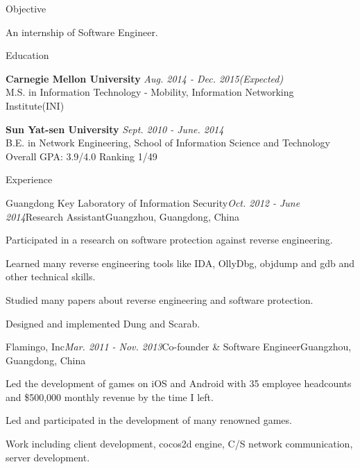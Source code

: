 \documentclass{resume} %
\begin{document}
\begin{rSection}{Objective}

An internship of Software Engineer.

\end{rSection}


\begin{rSection}{Education}

{\bf Carnegie Mellon University} \hfill {\em Aug. 2014 - Dec. 2015(Expected)} \\ 
M.S. in Information Technology - Mobility, 
Information Networking Institute(INI)

{\bf Sun Yat-sen University} \hfill {\em Sept. 2010 - June. 2014} \\ 
B.E. in Network Engineering, 
School of Information Science and Technology \\
Overall GPA: 3.9/4.0 Ranking 1/49

\end{rSection}


\begin{rSection}{Experience}

\begin{rSubsection}{Guangdong Key Laboratory of Information Security}{\em Oct. 2012 - June 2014}{Research Assistant}{Guangzhou, Guangdong, China}
\item Participated in a research on software protection against reverse engineering.
\item Learned many reverse engineering tools like IDA, OllyDbg, objdump and gdb and other technical skills.
\item Studied many papers about reverse engineering and software protection.
\item Designed and implemented Dung and Scarab.
\end{rSubsection}


\begin{rSubsection}{Flamingo, Inc}{\em Mar. 2011 - Nov. 2013}{Co-founder \& Software Engineer}{Guangzhou, Guangdong, China}
\item Led the development of games on iOS and Android with 35 employee headcounts and \$500,000 monthly revenue by the time I left.
\item Led and participated in the development of many renowned games.
\item Work including client development, cocos2d engine, C/S network communication, server development.
\end{rSubsection}

\end{rSection}
\end{document}
